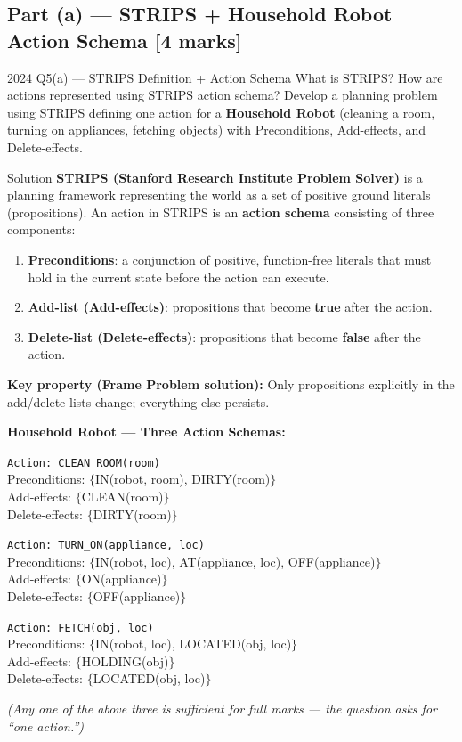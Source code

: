 \documentclass[12pt,a4paper]{article}
\begin{document}
\subsection{Part (a) --- STRIPS + Household Robot Action Schema [4 marks]}

\begin{qbox}{2024 Q5(a) --- STRIPS Definition + Action Schema}
What is STRIPS? How are actions represented using STRIPS action schema?
Develop a planning problem using STRIPS defining one action for a
\textbf{Household Robot} (cleaning a room, turning on appliances, fetching objects)
with Preconditions, Add-effects, and Delete-effects.
\end{qbox}

\begin{solbox}{Solution}
\textbf{STRIPS (Stanford Research Institute Problem Solver)} is a planning framework
representing the world as a set of positive ground literals (propositions).
An action in STRIPS is an \textbf{action schema} consisting of three components:
\begin{enumerate}[noitemsep]
  \item \textbf{Preconditions}: a conjunction of positive, function-free literals that
    must hold in the current state before the action can execute.
  \item \textbf{Add-list (Add-effects)}: propositions that become \textbf{true} after the action.
  \item \textbf{Delete-list (Delete-effects)}: propositions that become \textbf{false} after the action.
\end{enumerate}

\textbf{Key property (Frame Problem solution):}
Only propositions explicitly in the add/delete lists change; everything else persists.

\bigskip
\textbf{Household Robot --- Three Action Schemas:}

\medskip
\texttt{Action: CLEAN\_ROOM(room)}\\
\phantom{xxx}Preconditions: $\{$IN(robot, room), DIRTY(room)$\}$\\
\phantom{xxx}Add-effects: $\{$CLEAN(room)$\}$\\
\phantom{xxx}Delete-effects: $\{$DIRTY(room)$\}$

\medskip
\texttt{Action: TURN\_ON(appliance, loc)}\\
\phantom{xxx}Preconditions: $\{$IN(robot, loc), AT(appliance, loc), OFF(appliance)$\}$\\
\phantom{xxx}Add-effects: $\{$ON(appliance)$\}$\\
\phantom{xxx}Delete-effects: $\{$OFF(appliance)$\}$

\medskip
\texttt{Action: FETCH(obj, loc)}\\
\phantom{xxx}Preconditions: $\{$IN(robot, loc), LOCATED(obj, loc)$\}$\\
\phantom{xxx}Add-effects: $\{$HOLDING(obj)$\}$\\
\phantom{xxx}Delete-effects: $\{$LOCATED(obj, loc)$\}$

\medskip
\emph{(Any one of the above three is sufficient for full marks --- the question asks for
``one action.'')}
\end{solbox}
\end{document}

